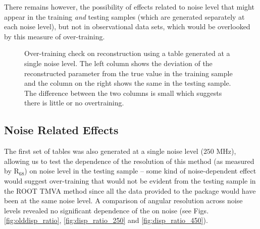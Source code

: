 \documentclass[main.tex]{subfiles}
\begin{document}
There remains however, the possibility of effects related to noise level that might appear in the training \textit{and} testing samples (which are generated separately at each noise level), but not in observational data sets, which would be overlooked by this measure of over-training.

\begin{figure}[H]
  \centering
  \caption[Over-training test.]{Over-training check on reconstruction using a \disp table generated at a single noise level. The left column shows the deviation of the reconstructed parameter from the true value in the training sample and the column on the right shows the same in the testing sample. The difference between the two columns is small which suggests there is little or no overtraining.}
  \label{fig:overtraining}
\end{figure}

\subsection{Noise Related Effects}
The first set of \disp tables was also generated at a single noise level ($250$ MHz), allowing us to test the dependence of the resolution of this method (as measured by R$_{68}$) on noise level in the testing sample -- some kind of noise-dependent effect would suggest over-training that would not be evident from the testing sample in the ROOT TMVA method since all the data provided to the package would have been at the same noise level. A comparison of angular resolution across noise levels revealed no significant dependence of the \rse on noise (see Figs. \ref{fig:olddisp_ratio}, \ref{fig:disp_ratio_250} and \ref{fig:disp_ratio_450}).
\end{document}
